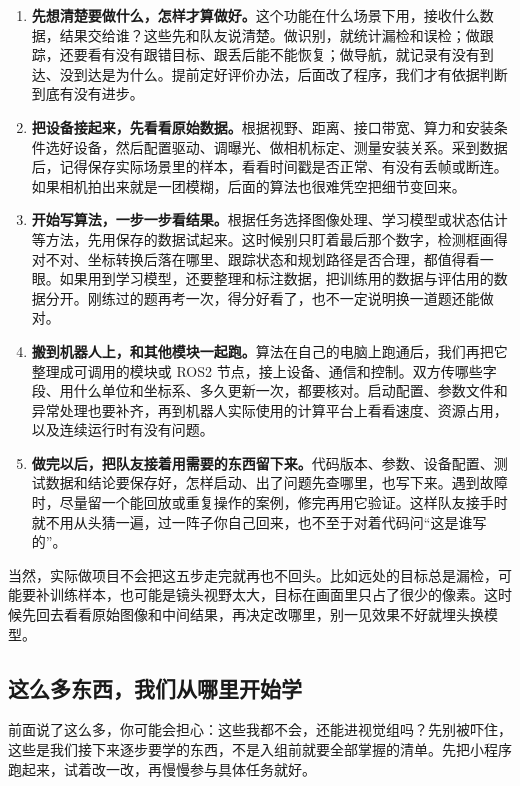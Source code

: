 \begin{enumerate}
    \item \textbf{先想清楚要做什么，怎样才算做好。}这个功能在什么场景下用，接收什么数据，结果交给谁？这些先和队友说清楚。做识别，就统计漏检和误检；做跟踪，还要看有没有跟错目标、跟丢后能不能恢复；做导航，就记录有没有到达、没到达是为什么。提前定好评价办法，后面改了程序，我们才有依据判断到底有没有进步。
    \item \textbf{把设备接起来，先看看原始数据。}根据视野、距离、接口带宽、算力和安装条件选好设备，然后配置驱动、调曝光、做相机标定、测量安装关系。采到数据后，记得保存实际场景里的样本，看看时间戳是否正常、有没有丢帧或断连。如果相机拍出来就是一团模糊，后面的算法也很难凭空把细节变回来。
    \item \textbf{开始写算法，一步一步看结果。}根据任务选择图像处理、学习模型或状态估计等方法，先用保存的数据试起来。这时候别只盯着最后那个数字，检测框画得对不对、坐标转换后落在哪里、跟踪状态和规划路径是否合理，都值得看一眼。如果用到学习模型，还要整理和标注数据，把训练用的数据与评估用的数据分开。刚练过的题再考一次，得分好看了，也不一定说明换一道题还能做对。
    \item \textbf{搬到机器人上，和其他模块一起跑。}算法在自己的电脑上跑通后，我们再把它整理成可调用的模块或 ROS2 节点，接上设备、通信和控制。双方传哪些字段、用什么单位和坐标系、多久更新一次，都要核对。启动配置、参数文件和异常处理也要补齐，再到机器人实际使用的计算平台上看看速度、资源占用，以及连续运行时有没有问题。
    \item \textbf{做完以后，把队友接着用需要的东西留下来。}代码版本、参数、设备配置、测试数据和结论要保存好，怎样启动、出了问题先查哪里，也写下来。遇到故障时，尽量留一个能回放或重复操作的案例，修完再用它验证。这样队友接手时就不用从头猜一遍，过一阵子你自己回来，也不至于对着代码问“这是谁写的”。
\end{enumerate}

当然，实际做项目不会把这五步走完就再也不回头。比如远处的目标总是漏检，可能要补训练样本，也可能是镜头视野太大，目标在画面里只占了很少的像素。这时候先回去看看原始图像和中间结果，再决定改哪里，别一见效果不好就埋头换模型。

\subsection*{这么多东西，我们从哪里开始学}
前面说了这么多，你可能会担心：这些我都不会，还能进视觉组吗？先别被吓住，这些是我们接下来逐步要学的东西，不是入组前就要全部掌握的清单。先把小程序跑起来，试着改一改，再慢慢参与具体任务就好。

